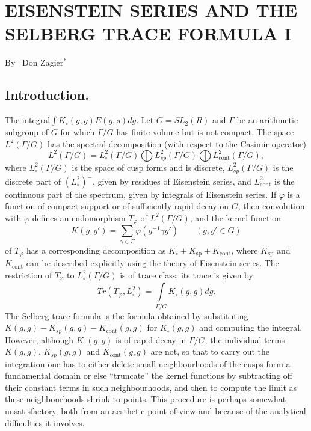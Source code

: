 \chapter{EISENSTEIN SERIES AND THE SELBERG TRACE FORMULA I}

\begin{center}
{\large By~ Don Zagier$^\ast$}
\end{center}

\bigskip

\setcounter{pageoriginal}{302}

\setcounter{section}{-1}
\section{Introduction.}\label{art11-sec0}
The integral\pageoriginale $\int K_\circ (g,g) E (g,s) dg$. Let $G = S L_2 (R)$ and $\Gamma$ be an arithmetic subgroup of $G$ for which $\Gamma / G$ has finite volume but is not compact. The space $L^2 (\Gamma / G)$ has the spectral decomposition (with respect to the Casimir operator)
$$
L^2 (\Gamma / G) = L^2_\circ (\Gamma / G) \bigoplus L^2_{sp} (\Gamma / G) \bigoplus L^2_{\text{cont}} (\Gamma / G),
$$
where $L^2_\circ (\Gamma / G)$ is the space of cusp forms and is discrete, $L^2_{sp} (\Gamma / G)$ is the discrete part of $(L^2_\circ)^\perp$, given by residues of Eisenstein series, and $L^2_{\text{cont}}$ is the continuous part of the spectrum, given by integrals of Eisenstein series. If $\varphi$ is a function of compact support or of sufficiently rapid decay on $G$, then convolution with $\varphi$ defines an endomorphism $T_\varphi$ of $L^2 (\Gamma / G)$, and the kernel function 
\begin{equation*}
K(g, g') = \sum\limits_{\gamma \in \Gamma} \varphi (g^{-1} \gamma g') \qquad (g, g' \in G) \tag{0.1} \label{art11-eq0.1}
\end{equation*}
of $T_\varphi$ has a corresponding decomposition as $K_\circ + K_{\text{sp}} + K_{\text{cont}}$, where $K_{\text{sp}}$ and $K_{\text{cont}}$ can be described explicitly using the theory of Eisenstein series. The restriction of $T_\varphi$ to $L^2_\circ (\Gamma / G)$ is of trace class; its trace is given by 
\begin{equation*}
Tr (T_\varphi, L^2_\circ )  = \int\limits_{\Gamma / G} K_\circ (g, g) dg. \tag{0.2} \label{art11-eq0.2}
\end{equation*}
The Selberg trace formula is the formula obtained by substituting $K(g,g) - K_{sp} (g,g) - K_{\text{cont}} (g, g)$ for $K_\circ (g,g)$ and computing the integral. However, although $K_\circ (g,g)$ is of rapid decay in $\Gamma / G$, the individual terms $K(g,g)$, $K_{sp} (g,g)$ and $K_{\text{cont}} (g,g)$ are not, so that to carry out the integration one has to either delete small neighbourhoods of the cusps form a fundamental domain or else ``truncate'' the kernel functions by subtracting off their constant terms in such neighbourhoods, and then to compute the limit as these neighbourhoods shrink to points. This procedure is perhaps somewhat unsatisfactory, both from an aesthetic point of view and because of the analytical difficulties it involves.

